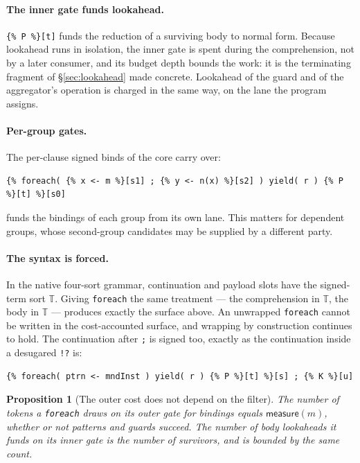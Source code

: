 \documentclass[11pt]{article}
\theoremstyle{definition}
\theoremstyle{plain}
\newtheorem{proposition}[definition]{Proposition}
\theoremstyle{remark}
\newcommand{\T}{\mathbb{T}}
\newcommand{\meas}{\mathsf{measure}}
\newcommand{\fe}{\texttt{foreach}}
\begin{document}
\paragraph{The inner gate funds lookahead.} \verb|{% P %}[t]| funds the
reduction of a surviving body to normal form. Because lookahead runs in
isolation, the inner gate is spent during the comprehension, not by a later
consumer, and its budget depth bounds the work: it is the terminating fragment
of \S\ref{sec:lookahead} made concrete. Lookahead of the guard and of the
aggregator's operation is charged in the same way, on the lane the program
assigns.

\paragraph{Per-group gates.} The per-clause signed binds of the core carry over:
\begin{lstlisting}
{% foreach( {% x <- m %}[s1] ; {% y <- n(x) %}[s2] ) yield( r ) {% P %}[t] %}[s0]
\end{lstlisting}
funds the bindings of each group from its own lane. This matters for dependent
groups, whose second-group candidates may be supplied by a different party.

\paragraph{The syntax is forced.} In the native four-sort grammar, continuation
and payload slots have the signed-term sort \(\T\). Giving \fe{} the same
treatment --- the comprehension in \(\T\), the body in \(\T\) --- produces
exactly the surface above. An unwrapped \fe{} cannot be written in the
cost-accounted surface, and wrapping by construction continues to hold. The
continuation after \texttt{;} is signed too, exactly as the continuation inside
a desugared \verb|!?| is:
\begin{lstlisting}
{% foreach( ptrn <- mndInst ) yield( r ) {% P %}[t] %}[s] ; {% K %}[u]
\end{lstlisting}

\begin{proposition}[The outer cost does not depend on the filter]
\label{prop:filterindep}
The number of tokens a \fe{} draws on its outer gate for bindings equals
\(\meas(m)\), whether or not patterns and guards succeed. The number of body
lookaheads it funds on its inner gate is the number of survivors, and is bounded
by the same count.
\end{proposition}
\end{document}
